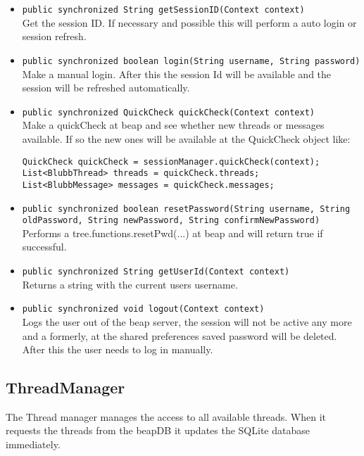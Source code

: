 \documentclass[12pt,a4paper,oneside]{report}
\newcommand{\code}[1]{\lstinline{#1}}
\begin{document}
\begin{itemize}
\item{\code{public synchronized String getSessionID(Context context)}}\\
Get the session ID. If necessary and possible this will perform a auto login or session refresh.

\item{\code{public synchronized boolean login(String username, String password)}}\\
Make a manual login. After this the session Id will be available and the session will be refreshed automatically.

\item{\code{public synchronized QuickCheck quickCheck(Context context)}}\\
Make a quickCheck at beap and see whether new threads or messages available. If so the new ones will be available at the QuickCheck object like: \begin{lstlisting}
QuickCheck quickCheck = sessionManager.quickCheck(context);
List<BlubbThread> threads = quickCheck.threads;
List<BlubbMessage> messages = quickCheck.messages;
\end{lstlisting}

\item{\code{public synchronized boolean resetPassword(String username, String oldPassword, String newPassword, String confirmNewPassword)}}\\
Performs a tree.functions.resetPwd(...) at beap and will return true if successful.

\item{\code{public synchronized String getUserId(Context context)}}\\
Returns a string with the current users username.

\item{\code{public synchronized void logout(Context context)}}\\
Logs the user out of the beap server, the session will not be active any more and a formerly, at the shared preferences saved password will be deleted. After this the user needs to log in manually.


\end{itemize}

\subsection{ThreadManager}
The Thread manager manages the access to all available threads. When it requests the threads from the beapDB it updates the SQLite database immediately. 
\end{document}
